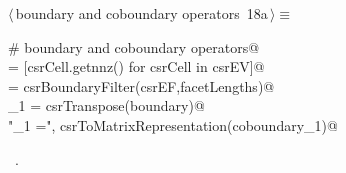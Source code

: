 \documentclass[11pt,oneside]{article}	%
\begin{document}
\begin{flushleft} \small
\begin{minipage}{\linewidth} \label{scrap36}
\protect{}$\langle\,$boundary and coboundary operators\nobreak\ {\footnotesize 18a}$\,\rangle\equiv$
\vspace{-1ex}
\begin{list}{}{} \item
\mbox{}\verb@# boundary and coboundary operators@\\
\mbox{}\verb@facetLengths = [csrCell.getnnz() for csrCell in csrEV]@\\
\mbox{}\verb@boundary = csrBoundaryFilter(csrEF,facetLengths)@\\
\mbox{}\verb@coboundary_1 = csrTranspose(boundary)@\\
\mbox{}\verb@print "\ncoboundary_1 =\n", csrToMatrixRepresentation(coboundary_1)@\\
\mbox{}\verb@@{\NWsep}
\end{list}
\vspace{-1ex}
\footnotesize\addtolength{\baselineskip}{-1ex}
\begin{list}{}{\setlength{\itemsep}{-\parsep}\setlength{\itemindent}{-\leftmargin}}
\item \NWtxtMacroRefIn\ .
\end{list}
\end{minipage}\\[4ex]
\end{flushleft}
\end{document}
